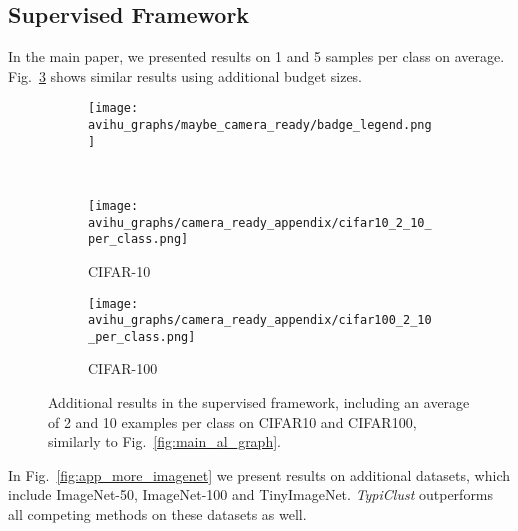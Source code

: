 \documentclass{article}
\begin{document}
\subsection{Supervised Framework}
\label{app:more_sup_empirical}
In the main paper, we presented results on 1 and 5 samples per class on average. Fig.~\ref{fig:app_cifar_more_budgets} shows similar results using additional budget sizes.


\begin{figure}[thb!]
\begin{center}
\begin{subfigure}{.45\textwidth}
  \centering
 \texttt{[image: avihu\_graphs/maybe\_camera\_ready/badge\_legend.png]}
\end{subfigure}
\\
    \begin{subfigure}{.157\textwidth}
      \centering
      \texttt{[image: avihu\_graphs/camera\_ready\_appendix/cifar10\_2\_10\_per\_class.png]}
\caption{CIFAR-10}
    \label{fig:app_al_graph_cifar10}
    \end{subfigure}
    \begin{subfigure}{.157\textwidth}
      \centering
      \texttt{[image: avihu\_graphs/camera\_ready\_appendix/cifar100\_2\_10\_per\_class.png]}
\caption{CIFAR-100}
    \label{fig:app_al_graph_cifar100}
    \end{subfigure}


\caption{Additional results in the supervised framework, including an average of 2 and 10 examples per class on CIFAR10 and CIFAR100, similarly to Fig.~\ref{fig:main_al_graph}.}
\label{fig:app_cifar_more_budgets}
\end{center}
\end{figure}

In Fig.~\ref{fig:app_more_imagenet} we present results on additional datasets, which include ImageNet-50, ImageNet-100 and TinyImageNet.
\emph{TypiClust} outperforms all competing methods on these datasets as well.
\end{document}
